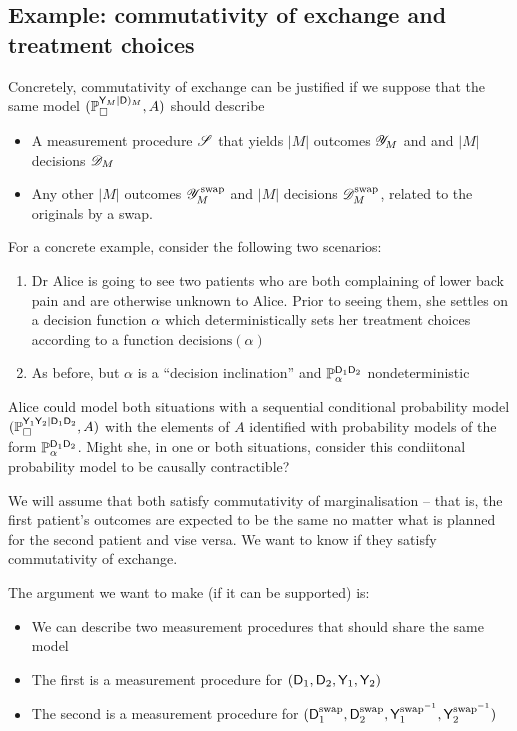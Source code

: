 \subsection{Example: commutativity of exchange and treatment choices}

Concretely, commutativity of exchange can be justified if we suppose that the same model $(\mathbb{P}_\square^{\mathsf{Y}_M|\mathsf{D})_M},A)$ should describe
\begin{itemize}
    \item A measurement procedure $\mathscr{S}$ that yields $|M|$ outcomes $\mathscr{Y}_M$ and and $|M|$ decisions $\mathscr{D}_M$
    \item Any other $|M|$ outcomes $\mathscr{Y}^{\text{swap}}_M$ and $|M|$ decisions $\mathscr{D}^{\text{swap}}_M$, related to the originals by a swap.
\end{itemize}

For a concrete example, consider the following two scenarios:

\begin{enumerate}
    \item Dr Alice is going to see two patients who are both complaining of lower back pain and are otherwise unknown to Alice. Prior to seeing them, she settles on a decision function $\alpha$ which deterministically sets her treatment choices according to a function $\text{decisions}(\alpha)$
    \item As before, but $\alpha$ is a ``decision inclination'' and $\mathbb{P}_\alpha^{\mathsf{D}_1\mathsf{D}_2}$ nondeterministic
\end{enumerate}

Alice could model both situations with a sequential conditional probability model $(\mathbb{P}_\square^{\mathsf{Y}_1\mathsf{Y}_2|\mathsf{D}_1\mathsf{D}_2},A)$ with the elements of $A$ identified with probability models of the form $\mathbb{P}_\alpha^{\mathsf{D}_1\mathsf{D}_2}$. Might she, in one or both situations, consider this condiitonal probability model to be causally contractible?

We will assume that both satisfy commutativity of marginalisation -- that is, the first patient's outcomes are expected to be the same no matter what is planned for the second patient and vise versa. We want to know if they satisfy commutativity of exchange.

The argument we want to make (if it can be supported) is:
\begin{itemize}
    \item We can describe two measurement procedures that should share the same model
    \item The first is a measurement procedure for $(\mathsf{D}_1,\mathsf{D}_2,\mathsf{Y}_1,\mathsf{Y}_2)$
    \item The second is a measurement procedure for $(\mathsf{D}^{\text{swap}}_1,\mathsf{D}^{\text{swap}}_2,\mathsf{Y}^{\text{swap}^{-1}}_1,\mathsf{Y}^{\text{swap}^{-1}}_2)$
\end{itemize}

